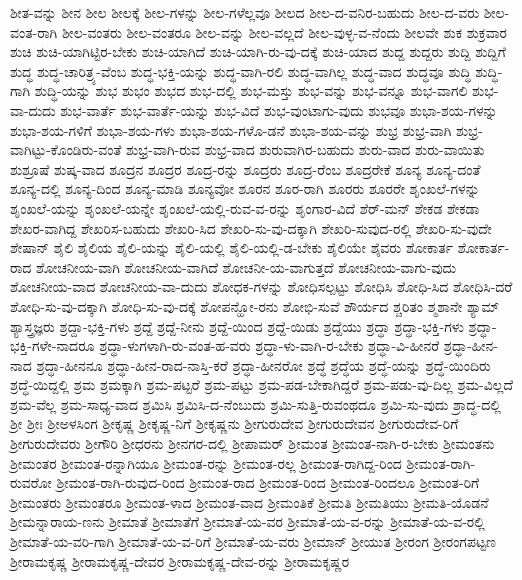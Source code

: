 {ಶೀತ-ವನ್ನು
ಶೀನ
ಶೀಲ
ಶೀಲಕ್ಕೆ
ಶೀಲ-ಗಳನ್ನು
ಶೀಲ-ಗಳೆಲ್ಲವೂ
ಶೀಲದ
ಶೀಲ-ದ-ವನಿರ-ಬಹುದು
ಶೀಲ-ದ-ವರು
ಶೀಲ-ವಂತ-ರಾಗಿ
ಶೀಲ-ವಂತರು
ಶೀಲ-ವಂತರೂ
ಶೀಲ-ವನ್ನು
ಶೀಲ-ವಲ್ಲದೆ
ಶೀಲ-ವುಳ್ಳ-ವ-ನೆಂದು
ಶೀಲವೇ
ಶುಕ
ಶುಕ್ರವಾರ
ಶುಚಿ
ಶುಚಿ-ಯಾಗಿಟ್ಟಿರ-ಬೇಕು
ಶುಚಿ-ಯಾಗಿದೆ
ಶುಚಿ-ಯಾಗಿ-ರು-ವು-ದಕ್ಕೆ
ಶುಚಿ-ಯಾದ
ಶುದ್ದ
ಶುದ್ದರು
ಶುದ್ದಿ
ಶುದ್ದಿಗೆ
ಶುದ್ಧ
ಶುದ್ಧ-ಚಾರಿತ್ರ್ಯ-ವೆಂಬ
ಶುದ್ಧ-ಭಕ್ತಿ-ಯನ್ನು
ಶುದ್ಧ-ವಾಗಿ-ರಲಿ
ಶುದ್ಧ-ವಾಗಿಲ್ಲ
ಶುದ್ಧ-ವಾದ
ಶುದ್ಧವೂ
ಶುದ್ಧಿ
ಶುದ್ಧಿ-ಗಾಗಿ
ಶುದ್ಧಿ-ಯನ್ನು
ಶುಭ
ಶುಭಂ
ಶುಭದ
ಶುಭ-ದಲ್ಲಿ
ಶುಭ-ಮಸ್ತು
ಶುಭ-ವನ್ನು
ಶುಭ-ವನ್ನೂ
ಶುಭ-ವಾಗಲಿ
ಶುಭ-ವಾ-ದುದು
ಶುಭ-ವಾರ್ತೆ
ಶುಭ-ವಾರ್ತೆ-ಯನ್ನು
ಶುಭ-ವಿದೆ
ಶುಭ-ವುಂಟಾಗು-ವುದು
ಶುಭವೂ
ಶುಭಾ-ಶಯ-ಗಳನ್ನು
ಶುಭಾ-ಶಯ-ಗಳಿಗೆ
ಶುಭಾ-ಶಯ-ಗಳು
ಶುಭಾ-ಶಯ-ಗಳೊ-ಡನೆ
ಶುಭಾ-ಶಯ-ವನ್ನು
ಶುಭ್ರ
ಶುಭ್ರ-ವಾಗಿ
ಶುಭ್ರ-ವಾಗಿಟ್ಟು-ಕೊಂಡಿರು-ವಂತೆ
ಶುಭ್ರ-ವಾಗಿ-ರುವ
ಶುಭ್ರ-ವಾದ
ಶುರುವಾಗಿರ-ಬಹುದು
ಶುರು-ವಾದ
ಶುರು-ವಾಯಿತು
ಶುಶ್ರೂಷೆ
ಶುಷ್ಕ-ವಾದ
ಶೂದ್ರನ
ಶೂದ್ರರ
ಶೂದ್ರ-ರನ್ನು
ಶೂದ್ರರು
ಶೂದ್ರ-ರೆಂಬ
ಶೂದ್ರರೇಕೆ
ಶೂನ್ಯ
ಶೂನ್ಯ-ದಂತೆ
ಶೂನ್ಯ-ದಲ್ಲಿ
ಶೂನ್ಯ-ದಿಂದ
ಶೂನ್ಯ-ಮಾಡಿ
ಶೂನ್ಯವೋ
ಶೂರನ
ಶೂರ-ರಾಗಿ
ಶೂರರು
ಶೂರರೇ
ಶೃಂಖಲೆ-ಗಳನ್ನು
ಶೃಂಖಲೆ-ಯನ್ನು
ಶೃಂಖಲೆ-ಯನ್ನೇ
ಶೃಂಖಲೆ-ಯಲ್ಲಿ-ರುವ-ವ-ರನ್ನು
ಶೃಂಗಾರ-ವಿದೆ
ಶೆರ್‌-ಮನ್
ಶೇಕಡ
ಶೇಕಡಾ
ಶೇಖರ-ವಾಗಿದ್ದ
ಶೇಖರಿಸ-ಬಹುದು
ಶೇಖರಿ-ಸಿದ
ಶೇಖರಿ-ಸು-ವು-ದಕ್ಕಾಗಿ
ಶೇಖರಿ-ಸುವುದ-ರಲ್ಲಿ
ಶೇಖರಿ-ಸು-ವುದೇ
ಶೇಷಾನ್
ಶೈಲಿ
ಶೈಲಿಯ
ಶೈಲಿ-ಯನ್ನು
ಶೈಲಿ-ಯಲ್ಲಿ
ಶೈಲಿ-ಯಲ್ಲಿ-ಡ-ಬೇಕು
ಶೈಲಿಯೇ
ಶೈವರು
ಶೋಕಾರ್ತ
ಶೋಕಾರ್ತ-ರಾದ
ಶೋಚನೀಯ-ವಾಗಿ
ಶೋಚನೀಯ-ವಾಗಿದೆ
ಶೋಚನೀ-ಯ-ವಾಗುತ್ತದೆ
ಶೋಚನೀಯ-ವಾಗು-ವುದು
ಶೋಚನೀಯ-ವಾದ
ಶೋಚನೀಯ-ವಾ-ದುದು
ಶೋಧಕ-ಗಳನ್ನು
ಶೋಧಿಸಲ್ಪಟ್ಟು
ಶೋಧಿಸಿ
ಶೋಧಿ-ಸಿದ
ಶೋಧಿಸಿ-ದರೆ
ಶೋಧಿ-ಸು-ವು-ದಕ್ಕಾಗಿ
ಶೋಧಿ-ಸು-ವು-ದಕ್ಕೆ
ಶೋಪನ್ಹೋ-ರನು
ಶೋಭಿ-ಸುವೆ
ಶೌರ್ಯದ
ಶ್ಚರಿತಂ
ಶ್ಮಶಾನೇ
ಶ್ಯಾಮ್
ಶ್ಯಾಸ್ತ್ರಜ್ಞರು
ಶ್ರದ್ದಾ-ಭಕ್ತಿ-ಗಳು
ಶ್ರದ್ದೆ
ಶ್ರದ್ದೆ-ನೀನು
ಶ್ರದ್ದೆ-ಯಿಂದ
ಶ್ರದ್ದೆ-ಯಿಡು
ಶ್ರದ್ದೆಯು
ಶ್ರದ್ಧಾ
ಶ್ರದ್ಧಾ-ಭಕ್ತಿ-ಗಳು
ಶ್ರದ್ಧಾ-ಭಕ್ತಿ-ಗಳೇ-ನಾದರೂ
ಶ್ರದ್ಧಾ-ಳುಗಳಾಗಿ-ರು-ವಂತ-ಹ-ವರು
ಶ್ರದ್ಧಾ-ಳು-ವಾಗಿ-ರ-ಬೇಕು
ಶ್ರದ್ಧಾ-ವಿ-ಹೀನರೆ
ಶ್ರದ್ಧಾ-ಹೀನ-ನಾದ
ಶ್ರದ್ಧಾ-ಹೀನನೂ
ಶ್ರದ್ಧಾ-ಹೀನ-ರಾದ-ನಾಸ್ತಿ-ಕರೆ
ಶ್ರದ್ಧಾ-ಹೀನರೋ
ಶ್ರದ್ಧೆ
ಶ್ರದ್ಧೆಯ
ಶ್ರದ್ಧೆ-ಯನ್ನು
ಶ್ರದ್ಧೆ-ಯಿಂದಿರು
ಶ್ರದ್ಧೆ-ಯಿದ್ದಲ್ಲಿ
ಶ್ರಮ
ಶ್ರಮಕ್ಕಾಗಿ
ಶ್ರಮ-ಪಟ್ಟರೆ
ಶ್ರಮ-ಪಟ್ಟು
ಶ್ರಮ-ಪಡ-ಬೇಕಾಗಿದ್ದರೆ
ಶ್ರಮ-ಪಡು-ವು-ದಿಲ್ಲ
ಶ್ರಮ-ವಿಲ್ಲದೆ
ಶ್ರಮ-ವೆಲ್ಲ
ಶ್ರಮ-ಸಾಧ್ಯ-ವಾದ
ಶ್ರಮಿಸಿ
ಶ್ರಮಿಸಿ-ದ-ನೆಂಬುದು
ಶ್ರಮಿ-ಸುತ್ತಿ-ರುವಂಥದೂ
ಶ್ರಮಿ-ಸು-ವುದು
ಶ್ರಾದ್ಧ-ದಲ್ಲಿ
ಶ್ರೀ
ಶ್ರೀಃ
ಶ್ರೀಅಳಸಿಂಗ
ಶ್ರೀಕೃಷ್ಣ
ಶ್ರೀಕೃಷ್ಣ-ನಿಗೆ
ಶ್ರೀಕೃಷ್ಣನು
ಶ್ರೀಗುರುದೇವ
ಶ್ರೀಗುರುದೇವನ
ಶ್ರೀಗುರುದೇವ-ರಿಗೆ
ಶ್ರೀಗುರುದೇವರು
ಶ್ರೀಗೌರಿ
ಶ್ರೀಧರನು
ಶ್ರೀನಗರ-ದಲ್ಲಿ
ಶ್ರೀಪಾಮರ್
ಶ್ರೀಮಂತ
ಶ್ರೀಮಂತ-ನಾಗಿ-ರ-ಬೇಕು
ಶ್ರೀಮಂತನು
ಶ್ರೀಮಂತರ
ಶ್ರೀಮಂತ-ರನ್ನಾಗಿಯೂ
ಶ್ರೀಮಂತ-ರನ್ನು
ಶ್ರೀಮಂತ-ರಲ್ಲ
ಶ್ರೀಮಂತ-ರಾಗಿದ್ದ-ರಿಂದ
ಶ್ರೀಮಂತ-ರಾಗಿ-ರುವರೋ
ಶ್ರೀಮಂತ-ರಾಗಿ-ರುವುದ-ರಿಂದ
ಶ್ರೀಮಂತ-ರಾದ
ಶ್ರೀಮಂತ-ರಿಂದ
ಶ್ರೀಮಂತ-ರಿಂದಲೂ
ಶ್ರೀಮಂತ-ರಿಗೆ
ಶ್ರೀಮಂತರು
ಶ್ರೀಮಂತರೂ
ಶ್ರೀಮಂತ-ಳಾದ
ಶ್ರೀಮಂತ-ವಾದ
ಶ್ರೀಮಂತಿಕೆ
ಶ್ರೀಮತಿ
ಶ್ರೀಮತಿಯು
ಶ್ರೀಮತಿ-ಯೊಡನೆ
ಶ್ರೀಮನ್ನಾರಾಯ-ಣನು
ಶ್ರೀಮಾತೆ
ಶ್ರೀಮಾತೆಗೆ
ಶ್ರೀಮಾತೆ-ಯ-ವರ
ಶ್ರೀಮಾತೆ-ಯ-ವ-ರನ್ನು
ಶ್ರೀಮಾತೆ-ಯ-ವ-ರಲ್ಲಿ
ಶ್ರೀಮಾತೆ-ಯ-ವರಿ-ಗಾಗಿ
ಶ್ರೀಮಾತೆ-ಯ-ವ-ರಿಗೆ
ಶ್ರೀಮಾತೆ-ಯ-ವರು
ಶ್ರೀಮಾನ್
ಶ್ರೀಯುತ
ಶ್ರೀರಂಗ
ಶ್ರೀರಂಗಪಟ್ಟಣ
ಶ್ರೀರಾಮಕೃಷ್ಣ
ಶ್ರೀರಾಮಕೃಷ್ಣ-ದೇವರ
ಶ್ರೀರಾಮಕೃಷ್ಣ-ದೇವ-ರನ್ನು
ಶ್ರೀರಾಮಕೃಷ್ಣರ
}

